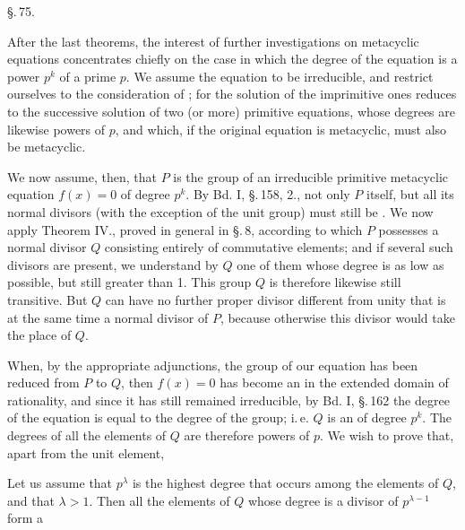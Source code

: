 \begin{center}
\S.\,75.\\
\end{center}

After the last theorems, the interest of further investigations on metacyclic equations concentrates chiefly on the case in which the degree of the equation is a power $p^k$ of a prime $p$. We assume the equation to be irreducible, and restrict ourselves to the consideration of ; for the solution of the imprimitive ones reduces to the successive solution of two (or more) primitive equations, whose degrees are likewise powers of $p$, and which, if the original equation is metacyclic, must also be metacyclic.

We now assume, then, that $P$ is the group of an irreducible primitive metacyclic equation $f(x) = 0$ of degree $p^k$. By Bd. I, \S.\,158, 2., not only $P$ itself, but all its normal divisors (with the exception of the unit group) must still be . We now apply Theorem IV., proved in general in \S.\,8, according to which $P$ possesses a normal divisor $Q$ consisting entirely of commutative elements; and if several such divisors are present, we understand by $Q$ one of them whose degree is as low as possible, but still greater than 1. This group $Q$ is therefore likewise still transitive. But $Q$ can have no further proper divisor different from unity that is at the same time a normal divisor of $P$, because otherwise this divisor would take the place of $Q$.

When, by the appropriate adjunctions, the group of our equation has been reduced from $P$ to $Q$, then $f(x) = 0$ has become an  in the extended domain of rationality, and since it has still remained irreducible, by Bd. I, \S.\,162 the degree of the equation is equal to the degree of the group; i.\,e. $Q$ is an  of degree $p^k$. The degrees of all the elements of $Q$ are therefore powers of $p$. We wish to prove that, apart from the unit element, 

Let us assume that $p^\lambda$ is the highest degree that occurs among the elements of $Q$, and that $\lambda > 1$. Then all the elements of $Q$ whose degree is a divisor of $p^{\lambda-1}$ form a
